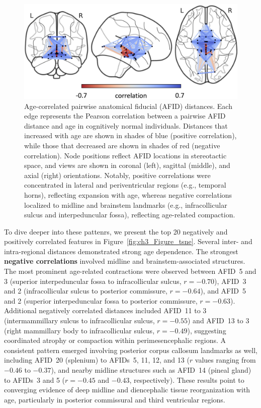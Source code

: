 \begin{figure}[hbt!]
    \centering
    \includegraphics[width=0.88\linewidth]{figs/ch3_Figure_alldist.png}
    \caption{Age-correlated pairwise anatomical fiducial (AFID) distances. Each edge represents the Pearson correlation between a pairwise AFID distance and age in cognitively normal individuals. Distances that increased with age are shown in shades of blue (positive correlation), while those that decreased are shown in shades of red (negative correlation). Node positions reflect AFID locations in stereotactic space, and views are shown in coronal (left), sagittal (middle), and axial (right) orientations. Notably, positive correlations were concentrated in lateral and periventricular regions (e.g., temporal horns), reflecting expansion with age, whereas negative correlations localized to midline and brainstem landmarks (e.g., infracollicular sulcus and interpeduncular fossa), reflecting age-related compaction.}
    \label{fig:ch3_Figure_alldist}
\end{figure}
To dive deeper into these pattenrs, we present the top 20 negatively and positively correlated features in Figure~\ref{fig:ch3_Figure_tsne}. Several inter- and intra-regional distances demonstrated strong age dependence. The strongest \textbf{negative correlations} involved midline and brainstem-associated structures. The most prominent age-related contractions were observed between AFID~5 and 3 (superior interpeduncular fossa to infracollicular sulcus, $r = -0.70$), AFID~3 and 2 (infracollicular sulcus to posterior commissure, $r = -0.64$), and AFID~5 and 2 (superior interpeduncular fossa to posterior commissure, $r = -0.63$). Additional negatively correlated distances included AFID~11 to 3 (intermammillary sulcus to infracollicular sulcus, $r = -0.55$) and AFID~13 to 3 (right mammillary body to infracollicular sulcus, $r = -0.49$), suggesting coordinated atrophy or compaction within perimesencephalic regions. A consistent pattern emerged involving posterior corpus callosum landmarks as well, including AFID~20 (splenium) to AFIDs~5, 11, 12, and 13 ($r$ values ranging from $-0.46$ to $-0.37$), and nearby midline structures such as AFID~14 (pineal gland) to AFIDs~3 and 5 ($r = -0.45$ and $-0.43$, respectively). These results point to converging evidence of deep midline and diencephalic tissue reorganization with age, particularly in posterior commissural and third ventricular regions.

